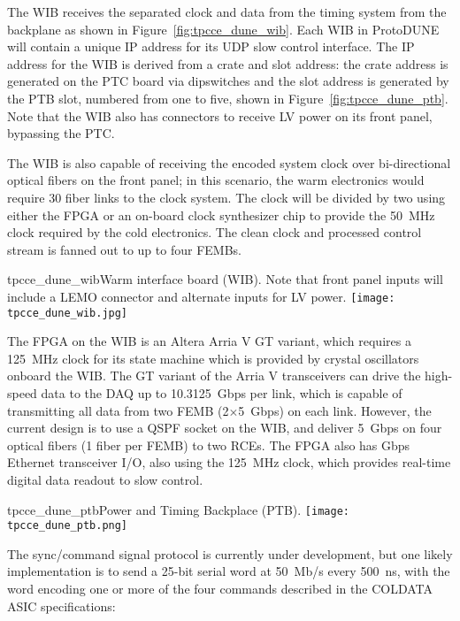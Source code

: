 The WIB receives the separated clock and data from the timing system from the backplane
as shown in Figure~\ref{fig:tpcce_dune_wib}. Each WIB in ProtoDUNE will contain a 
unique IP address for its UDP slow control interface. The IP address for the WIB is 
derived from a crate and slot address: the crate address is generated on the PTC 
board via dipswitches and the slot address is generated by the PTB slot, numbered 
from one to five, shown in Figure~\ref{fig:tpcce_dune_ptb}. Note that the WIB also has 
connectors to receive LV power on its front panel, bypassing the PTC.

The WIB is also capable of
receiving the encoded system clock over bi-directional optical
fibers on the front panel; in this scenario, the warm electronics would require 
30 fiber links to the clock system. The clock will be divided by two using either
the FPGA or an on-board clock synthesizer chip to provide the 50~MHz
clock required by the cold electronics.  The clean clock and processed
control stream is fanned out to up to four FEMBs.

\begin{cdrfigure}{tpcce_dune_wib}{Warm interface board (WIB). Note 
that front panel inputs will include a LEMO connector and alternate inputs for LV power.}
\texttt{[image: tpcce\_dune\_wib.jpg]}
\end{cdrfigure}

The FPGA on the WIB is an Altera Arria V GT variant, which requires a
125~MHz clock for its state machine which is provided by crystal
oscillators onboard the WIB. The GT variant of the Arria V
transceivers can drive the high-speed data to the DAQ up to
10.3125~Gbps per link, which is capable of transmitting all data from
two FEMB (2$\times$5~Gbps) on each link. However, the current design is to
use a QSPF socket on the WIB, and deliver 5~Gbps on four optical fibers 
(1 fiber per FEMB) to two RCEs. The FPGA also has Gbps Ethernet
transceiver I/O, also using the 125~MHz clock, which provides
real-time digital data readout to slow control.

\begin{cdrfigure}{tpcce_dune_ptb}{Power and Timing Backplace (PTB).}
\texttt{[image: tpcce\_dune\_ptb.png]}
\end{cdrfigure}

The sync/command signal protocol is currently under development, but
one likely implementation is to send a 25-bit serial word at 50~Mb/s
every 500~ns, with the word encoding one or more of the four commands
described in the COLDATA ASIC specifications:

